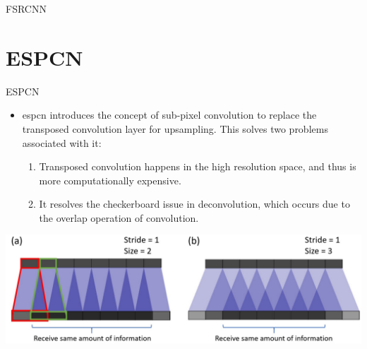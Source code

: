 \documentclass[hyperref={unicode}, xcolor=dvipsnames, t]{beamer}
\begin{document}
\begin{frame}{FSRCNN}
\begin{center}
{        }
    \end{center}
\end{frame}

\section{ESPCN}
\begin{frame}{ESPCN}
    \begin{itemize}
        \item \gls{espcn} introduces the concept of sub-pixel convolution to replace the transposed convolution layer for upsampling. This solves two problems associated with it:
        \begin{enumerate}
            \item Transposed convolution happens in the high resolution space, and thus is more computationally expensive.
            \item It resolves the checkerboard issue in deconvolution, which occurs due to the overlap operation of convolution.
        \end{enumerate}
    \end{itemize}
    \begin{center}
        \includegraphics[keepaspectratio, height=0.4\textheight]{figures/trans_conv_problem.png}
    \end{center}
\end{frame}
\end{document}
